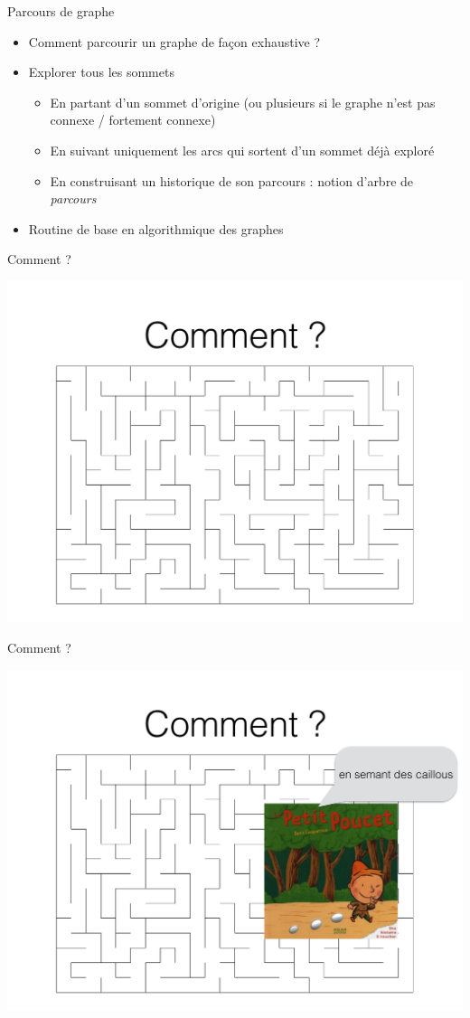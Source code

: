 
\begin{frame}{Parcours de graphe}
\begin{itemize}
    \item Comment parcourir un graphe de façon exhaustive ?
    \item Explorer tous les sommets 
    \begin{itemize}
        \item En partant d'un sommet d'origine (ou plusieurs si le graphe n'est pas connexe / fortement connexe)
        \item En suivant uniquement les arcs qui sortent d'un sommet déjà exploré
        \item En construisant un historique de son parcours : notion d'arbre de \emph{parcours}
    \end{itemize}
    \item Routine de base en algorithmique des graphes 
\end{itemize}
\end{frame}

\begin{frame}{Comment ?}
    \begin{center}
        \includegraphics[width=.75\textwidth]{fig/labyrinthe.pdf}
    \end{center}
\end{frame}

\begin{frame}{Comment ?}
    \begin{center}
        \includegraphics[width=.75\textwidth]{fig/labyrinthe-cailloux.pdf}
    \end{center}
\end{frame}

